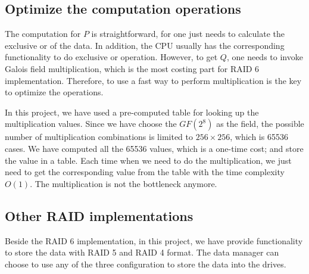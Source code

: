 \subsection{Optimize the computation operations}

The computation for $P$ is straightforward, for one just needs to calculate the exclusive or of the data. In addition, the CPU usually has the corresponding functionality to do exclusive or operation. However, to get $Q$, one needs to invoke Galois field multiplication, which is the most costing part for RAID 6 implementation. Therefore, to use a fast way to perform multiplication is the key to optimize the operations. 

In this project, we have used a pre-computed table for looking up the multiplication values. Since we have choose the $GF(2^8)$ as the field, the possible number of multiplication combinations is limited to $256 \times 256$, which is 65536 cases. We have computed all the 65536 values, which is a one-time cost; and store the value in a table. Each time when we need to do the multiplication, we just need to get the corresponding value from the table with the time complexity $O(1)$. The multiplication is not the bottleneck anymore.

\subsection{Other RAID implementations}

Beside the RAID 6 implementation, in this project, we have provide functionality to store the data with RAID 5 and RAID 4 format. The data manager can choose to use any of the three configuration to store the data into the drives.
